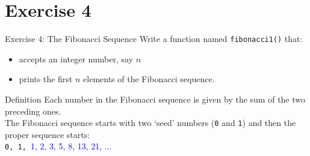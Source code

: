 \documentclass[t,handout,9pt]{beamer}
\begin{document}
\section{Exercise 4}
\begin{frame}{Exercise 4: The Fibonacci Sequence}
\vfill
Write a function named \texttt{fibonacci1()} that:
\begin{itemize}
	\item accepts an integer number, say $n$
	\item prints the first $n$ elements of the Fibonacci sequence.
\end{itemize}
\begin{block}{Definition}
Each number in the Fibonacci sequence is given by the sum of the two preceding ones.\\
The Fibonacci sequence starts with two `seed' numbers (\texttt{0} and \texttt{1}) and then the proper sequence starts:\\
\qquad \texttt{0, 1, }\textcolor{blue}{1, 2, 3, 5, 8, 13, 21, ...}
\end{block}
\vfill
\end{frame}
%
\end{document}
